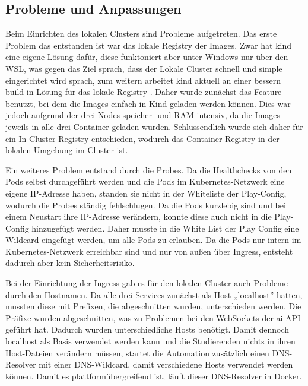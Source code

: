 \subsection{Probleme und Anpassungen}
Beim Einrichten des lokalen Clusters sind Probleme aufgetreten.
Das erste Problem das entstanden ist war das lokale Registry der Images. Zwar hat kind eine eigene Lösung dafür, diese funktoniert aber unter Windows nur über den WSL, was gegen das Ziel sprach, dass der Lokale Cluster schnell und simple eingerichtet wird sprach, 
zum weitern arbeitet kind aktuell an einer bessern build-in Lösung für das lokale Registry \parencite{kind_local_registry}.
Daher wurde zunächst das Feature benutzt, bei dem die Images einfach in Kind geladen werden können. Dies war jedoch aufgrund der drei Nodes speicher- und RAM-intensiv, da die Images jeweils in alle drei Container geladen wurden.
Schlussendlich wurde sich daher für ein In-Cluster-Registry entschieden, wodurch das Container Registry in der lokalen Umgebung im Cluster ist.

Ein weiteres Problem entstand durch die Probes. Da die Healthchecks von den Pods selbst durchgeführt werden und die Pods im Kubernetes-Netzwerk eine eigene IP-Adresse haben, standen sie nicht in der Whiteliste der Play-Config, wodurch die Probes ständig fehlschlugen.
Da die Pods kurzlebig sind und bei einem Neustart ihre IP-Adresse verändern, konnte diese auch nicht in die Play-Config hinzugefügt werden. Daher musste in die White List der Play Config eine Wildcard eingefügt werden, um alle Pods zu erlauben. Da die Pods nur intern im Kubernetes-Netzwerk erreichbar sind und nur von außen über Ingress, entsteht dadurch aber kein Sicherheitsrisiko.

Bei der Einrichtung der Ingress gab es für den lokalen Cluster auch Probleme durch den Hostnamen. Da alle drei Services zunächst als Host „localhost” hatten, mussten diese mit Prefixen, die abgeschnitten wurden, unterschieden werden.
Die Präfixe wurden abgeschnitten, was zu Problemen bei den WebSockets der ai-API geführt hat. Dadurch wurden unterschiedliche Hosts benötigt.
Damit dennoch localhost als Basis verwendet werden kann und die Studierenden nichts in ihren Host-Dateien verändern müssen, startet die Automation zusätzlich einen DNS-Resolver mit einer DNS-Wildcard, damit verschiedene Hosts verwendet werden können.
Damit es plattformübergreifend ist, läuft dieser DNS-Resolver in Docker.